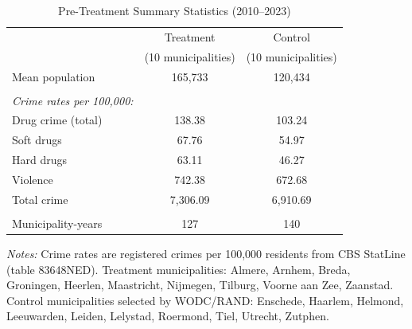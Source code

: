 \begin{table}[t]
\centering
\caption{Pre-Treatment Summary Statistics (2010--2023)}
\label{tab:summary}
\begin{tabular}{lcc}
\hline\hline
 & Treatment & Control \\
 & (10 municipalities) & (10 municipalities) \\
\hline
Mean population & 165,733 & 120,434 \\
 & & \\
\textit{Crime rates per 100,000:} & & \\
\quad Drug crime (total) & 138.38 & 103.24 \\
\qquad Soft drugs & 67.76 & 54.97 \\
\qquad Hard drugs & 63.11 & 46.27 \\
\quad Violence & 742.38 & 672.68 \\
\quad Total crime & 7,306.09 & 6,910.69 \\
 & & \\
Municipality-years & 127 & 140 \\
\hline\hline
\end{tabular}
\begin{tablenotes}
\item \textit{Notes:} Crime rates are registered crimes per 100,000 residents from CBS StatLine (table 83648NED). Treatment municipalities: Almere, Arnhem, Breda, Groningen, Heerlen, Maastricht, Nijmegen, Tilburg, Voorne aan Zee, Zaanstad. Control municipalities selected by WODC/RAND: Enschede, Haarlem, Helmond, Leeuwarden, Leiden, Lelystad, Roermond, Tiel, Utrecht, Zutphen.
\end{tablenotes}
\end{table}

